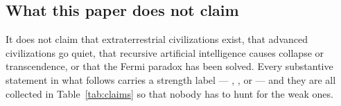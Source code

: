 \subsection{What this paper does not claim}

It does not claim that extraterrestrial civilizations exist, that advanced
civilizations go quiet, that recursive artificial intelligence causes collapse
or transcendence, or that the Fermi paradox has been solved. Every substantive
statement in what follows carries a strength label --- \Established, \Plausible,
\Hypothetical{} or \Speculative{} --- and they are all collected in
Table~\ref{tab:claims} so that nobody has to hunt for the weak ones.
